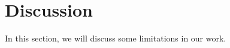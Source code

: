 \section{Discussion} \label{sec:discussion}

In this section, we will discuss some limitations in our work.

